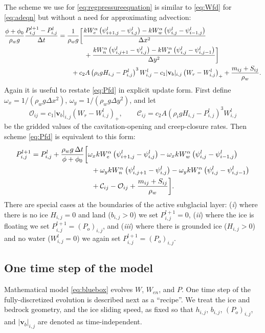 \documentclass[11pt,final]{amsart}
\newcommand\bv{\mathbf{v}}
\newcommand{\Wlij}{W^l_{i,j}}
\newcommand{\Plij}{P^l_{i,j}}
\begin{document}
The scheme we use for \eqref{eq:regpressureequation} is similar to \eqref{eq:Wfd} for \eqref{eq:adeqn} but without a need for approximating advection:
\begin{align}
\frac{\phi+\phi_0}{\rho_w g} \frac{P_{i,j}^{l+1} - \Plij}{\Delta t} &= \frac{1}{\rho_w g} \bigg[\frac{k W_e^\alpha \left(\psi_{i+1,j}^l - \psi_{i,j}^l\right) - k W_w^\alpha \left(\psi_{i,j}^l - \psi_{i-1,j}^l\right)}{\Delta x^2}  \label{eq:Pfd} \\
      &\qquad\qquad + \frac{k W_n^\alpha \left(\psi_{i,j+1}^l - \psi_{i,j}^l\right) - k W_s^\alpha \left(\psi_{i,j}^l - \psi_{i,j-1}^l\right)}{\Delta y^2}\bigg] \notag \\
      &\qquad + c_2 A \left(\rho_i g H_{i,j}- \Plij\right)^3 \Wlij - c_1 |\bv_b|_{i,j} \left(W_r - \Wlij\right)_+ + \frac{m_{ij} + S_{ij}}{\rho_w}. \notag
\end{align}
Again it is useful to restate \eqref{eq:Pfd} in explicit update form.  First define $\omega_x = 1/(\rho_w g \Delta x^2)$, $\omega_y = 1/(\rho_w g \Delta y^2)$, and let
	$$\mathcal{O}_{ij} = c_1 |\bv_b|_{i,j} \left(W_r - \Wlij\right)_+, \qquad \mathcal{C}_{ij} = c_2 A \left(\rho_i g H_{i,j} - \Plij\right)^3 \Wlij$$
be the gridded values of the cavitation-opening and creep-closure rates.  Then scheme \eqref{eq:Pfd} is equivalent to this form:
\begin{align}
P_{i,j}^{l+1} = \Plij +  \frac{\rho_w g\,\Delta t}{\phi+\phi_0} &\bigg[\omega_x k W_e^\alpha \left(\psi_{i+1,j}^l - \psi_{i,j}^l\right) - \omega_x k W_w^\alpha \left(\psi_{i,j}^l - \psi_{i-1,j}^l\right) \label{eq:Pfdupdate} \\
      &\quad + \omega_y k W_n^\alpha \left(\psi_{i,j+1}^l - \psi_{i,j}^l\right) - \omega_y k W_s^\alpha \left(\psi_{i,j}^l - \psi_{i,j-1}^l\right) \notag \\
      &\quad + \mathcal{C}_{ij} - \mathcal{O}_{ij} + \frac{m_{ij} + S_{ij}}{\rho_w}\bigg]. \notag
\end{align}
There are special cases at the boundaries of the active subglacial layer: (\emph{i}) where there is no ice $H_{i,j}=0$ and land ($b_{i,j}>0$) we set $P_{i,j}^{l+1}=0$, (\emph{ii}) where the ice is floating we set $P_{i,j}^{l+1}=(P_o)_{i,j}$, and (\emph{iii}) where there is grounded ice ($H_{i,j}>0$) and no water ($W_{i,j}^l=0$) we again set $P_{i,j}^{l+1}=(P_o)_{i,j}$. 

\subsection*{One time step of the model}  Mathematical model \eqref{eq:bluebox} evolves $W$, $W_{en}$, and $P$.  One time step of the fully-discretized evolution is described next as a ``recipe''.  We treat the ice and bedrock geometry, and the ice sliding speed, as fixed so that $h_{i,j}$, $b_{i,j}$, $(P_o)_{i,j}$, and $|\bv_b|_{i,j}$ are denoted as time-independent.
\end{document}
